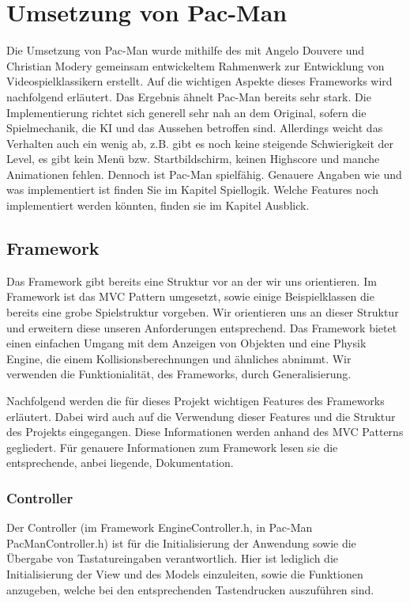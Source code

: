 \documentclass[a4paper, 11pt]{article}
\begin{document}
\pagebreak
\section{Umsetzung von Pac-Man}

Die Umsetzung von Pac-Man wurde mithilfe des mit Angelo Douvere und Christian Modery gemeinsam entwickeltem Rahmenwerk zur Entwicklung von Videospielklassikern erstellt. Auf die wichtigen Aspekte dieses Frameworks wird nachfolgend erläutert. Das Ergebnis ähnelt Pac-Man bereits sehr stark. Die Implementierung richtet sich generell sehr nah an dem Original, sofern die Spielmechanik, die KI und das Aussehen betroffen sind. Allerdings weicht das Verhalten auch ein wenig ab, z.B. gibt es noch keine steigende Schwierigkeit der Level, es gibt kein Menü bzw. Startbildschirm, keinen Highscore und manche Animationen fehlen. Dennoch ist Pac-Man spielfähig. Genauere Angaben wie und was implementiert ist finden Sie im Kapitel Spiellogik. Welche Features noch implementiert werden könnten, finden sie im Kapitel Ausblick.

\subsection{Framework}

Das Framework gibt bereits eine Struktur vor an der wir uns orientieren. Im Framework ist das MVC Pattern umgesetzt, sowie einige Beispielklassen die bereits eine grobe Spielstruktur vorgeben. Wir orientieren uns an dieser Struktur und erweitern diese unseren Anforderungen entsprechend. Das Framework bietet einen einfachen Umgang mit dem Anzeigen von Objekten und eine Physik Engine, die einem Kollisionsberechnungen und ähnliches abnimmt. Wir verwenden die Funktionialität, des Frameworks, durch Generalisierung.

Nachfolgend werden die für dieses Projekt wichtigen Features des Frameworks erläutert. Dabei wird auch auf die Verwendung dieser Features und die Struktur des Projekts eingegangen. Diese Informationen werden anhand des MVC Patterns gegliedert. Für genauere Informationen zum Framework lesen sie die entsprechende, anbei liegende, Dokumentation.

\subsubsection{Controller}

Der Controller (im Framework EngineController.h, in Pac-Man PacManController.h) ist für die Initialisierung der Anwendung sowie die Übergabe von Tastatureingaben verantwortlich. Hier ist lediglich die Initialisierung der View und des Models einzuleiten, sowie die Funktionen anzugeben, welche bei den entsprechenden Tastendrucken auszuführen sind. 
\end{document}
